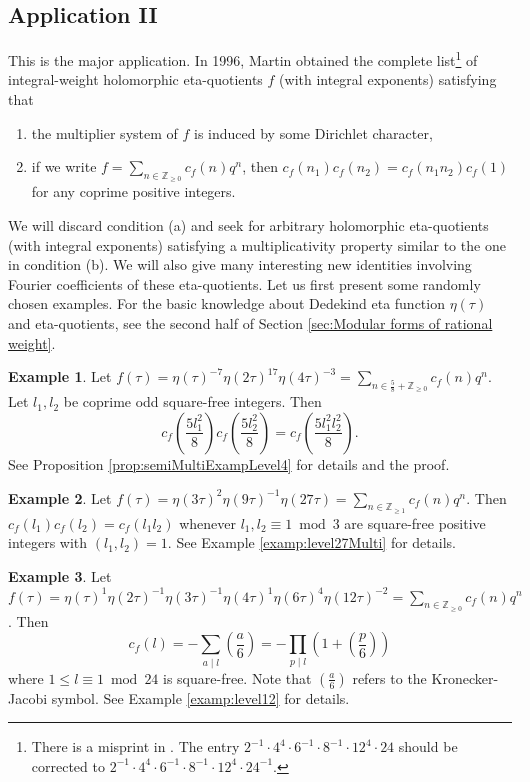 \documentclass[12pt]{amsart}
\numberwithin{equation}{section}
\theoremstyle{plain}
\theoremstyle{definition}
\newtheorem*{examp*}{Example}
\theoremstyle{remark}
\newcommand\legendre[2]{\genfrac{(}{)}{}{}{#1}{#2}}
\newcommand\numgeq[2]{\mathbb{#1}_{\geq #2}}
\begin{document}
\subsection{Application II}
\label{subsec:AppII}
This is the major application. In 1996, Martin \cite{Mar96} obtained the complete list\footnote{There is a misprint in \cite[p. 4853]{Mar96}. The entry $2^{-1}\cdot4^4\cdot6^{-1}\cdot8^{-1}\cdot12^{4}\cdot24$ should be corrected to $2^{-1}\cdot4^4\cdot6^{-1}\cdot8^{-1}\cdot12^{4}\cdot24^{-1}$.} of integral-weight holomorphic eta-quotients $f$ (with integral exponents) satisfying that
\begin{enumerate}
  \item the multiplier system of $f$ is induced by some Dirichlet character,
  \item if we write $f=\sum_{n\in\numgeq{Z}{0}}c_f(n)q^n$, then $c_f(n_1)c_f(n_2)=c_f(n_1n_2)c_f(1)$ for any coprime positive integers.
\end{enumerate}
We will discard condition (a) and seek for arbitrary holomorphic eta-quotients (with integral exponents) satisfying a multiplicativity property similar to the one in condition (b). We will also give many interesting new identities involving Fourier coefficients of these eta-quotients. Let us first present some randomly chosen examples. For the basic knowledge about Dedekind eta function $\eta(\tau)$ and eta-quotients, see the second half of Section \ref{sec:Modular forms of rational weight}.
\begin{examp*}
Let $f(\tau)=\eta(\tau)^{-7}\eta(2\tau)^{17}\eta(4\tau)^{-3}=\sum_{n\in\frac{5}{8}+\numgeq{Z}{0}}c_f(n)q^n$. Let $l_1,l_2$ be coprime odd square-free integers. Then
\begin{equation*}
c_f\left(\frac{5l_1^2}{8}\right)c_f\left(\frac{5l_2^2}{8}\right)=c_f\left(\frac{5l_1^2l_2^2}{8}\right).
\end{equation*}
See Proposition \ref{prop:semiMultiExampLevel4} for details and the proof.
\end{examp*}

\begin{examp*}
Let $f(\tau)=\eta(3\tau)^2\eta(9\tau)^{-1}\eta(27\tau)=\sum_{n\in\numgeq{Z}{1}}c_f(n)q^n$. Then $c_f(l_1)c_f(l_2)=c_f(l_1l_2)$ whenever $l_1,l_2\equiv1\bmod{3}$ are square-free positive integers with $(l_1,l_2)=1$. See Example \ref{examp:level27Multi} for details.
\end{examp*}

\begin{examp*}
Let $f(\tau)=\eta(\tau)^{1}\eta(2\tau)^{-1}\eta(3\tau)^{-1}\eta(4\tau)^{1}\eta(6\tau)^4\eta(12\tau)^{-2}=\sum_{n\in\numgeq{Z}{0}}c_f(n)q^n$. Then
\begin{equation*}
c_f(l)=-\sum_{a\mid l}\legendre{a}{6}=-\prod_{p\mid l}\left(1+\legendre{p}{6}\right)
\end{equation*}
where $1\leq l\equiv1\bmod{24}$ is square-free. Note that $\legendre{a}{6}$ refers to the Kronecker-Jacobi symbol. See Example \ref{examp:level12} for details.
\end{examp*}
\end{document}
